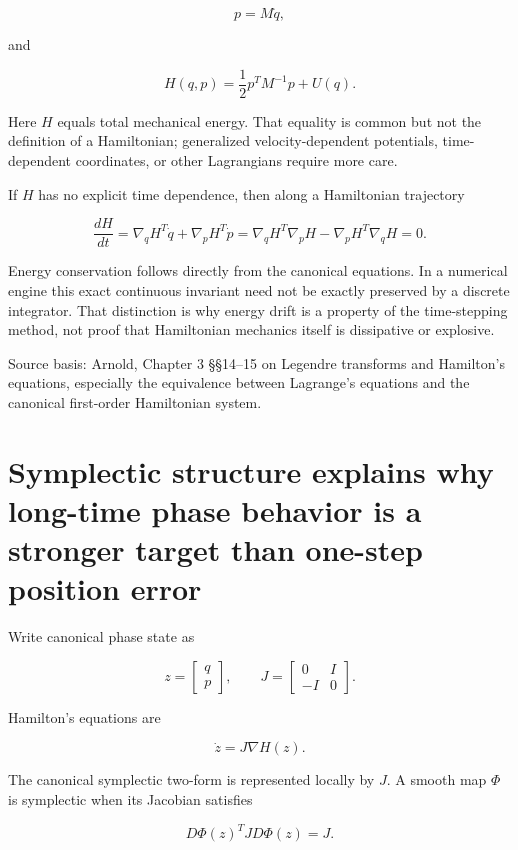 \[
p=M\dot q,
\]

and

\[
H(q,p)
=
\frac12p^TM^{-1}p+U(q).
\]

Here \(H\) equals total mechanical energy. That equality is common but not the definition of a Hamiltonian; generalized velocity-dependent potentials, time-dependent coordinates, or other Lagrangians require more care.

If \(H\) has no explicit time dependence, then along a Hamiltonian trajectory

\[
\frac{dH}{dt}
=
\nabla_qH^T\dot q
+
\nabla_pH^T\dot p
=
\nabla_qH^T\nabla_pH
-
\nabla_pH^T\nabla_qH
=
0.
\]

Energy conservation follows directly from the canonical equations. In a numerical engine this exact continuous invariant need not be exactly preserved by a discrete integrator. That distinction is why energy drift is a property of the time-stepping method, not proof that Hamiltonian mechanics itself is dissipative or explosive.

Source basis: Arnold, Chapter 3 §§14--15 on Legendre transforms and Hamilton's equations, especially the equivalence between Lagrange's equations and the canonical first-order Hamiltonian system.

\section{Symplectic structure explains why long-time phase behavior is a stronger target than one-step position error}\label{06-engine-ii-ch033-symplectic-structure-explains-why-long-time-phase-behavior-is-a-stronger-target-than-one-step-position-error}

Write canonical phase state as

\[
z=
\begin{bmatrix}
q\\p
\end{bmatrix},
\qquad
J=
\begin{bmatrix}
0&I\\
-I&0
\end{bmatrix}.
\]

Hamilton's equations are

\[
\dot z
=
J\nabla H(z).
\]

The canonical symplectic two-form is represented locally by \(J\). A smooth map \(\Phi\) is symplectic when its Jacobian satisfies

\[
D\Phi(z)^T J D\Phi(z)=J.
\]

